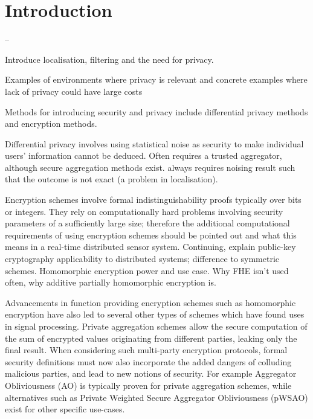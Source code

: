 \documentclass[twocolumn]{autart}
\begin{document}
% 
%                                         
%                                         
%                                         
% 

\section{Introduction}


--

Introduce localisation, filtering and the need for privacy. 

Examples of environments where privacy is relevant and concrete examples where lack of privacy could have large costs

Methods for introducing security and privacy include differential privacy methods and encryption methods. 

Differential privacy involves using statistical noise as security to make individual users' information cannot be deduced. Often requires a trusted aggregator, although secure aggregation methods exist. always requires noising result such that the outcome is not exact (a problem in localisation).

Encryption schemes involve formal indistinguishability proofs typically over bits or integers. They rely on computationally hard problems involving security parameters of a sufficiently large size; therefore the additional computational requirements of using encryption schemes should be pointed out and what this means in a real-time distributed sensor system. Continuing, explain public-key cryptography applicability to distributed systems; difference to symmetric schemes. Homomorphic encryption power and use case. Why FHE isn't used often, why additive partially homomorphic encryption is.

Advancements in function providing encryption schemes such as homomorphic encryption have also led to several other types of schemes which have found uses in signal processing. Private aggregation schemes allow the secure computation of the sum of encrypted values originating from different parties, leaking only the final result. When considering such multi-party encryption protocols, formal security definitions must now also incorporate the added dangers of colluding malicious parties, and lead to new notions of security. For example Aggregator Obliviousness (AO) is typically proven for private aggregation schemes, while alternatives such as Private Weighted Secure Aggregator Obliviousness (pWSAO) exist for other specific use-cases.
\end{document}
